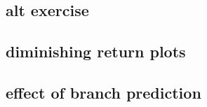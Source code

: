 
\subsection{alt exercise}


\subsection{diminishing return plots}


\subsection{effect of branch prediction}


